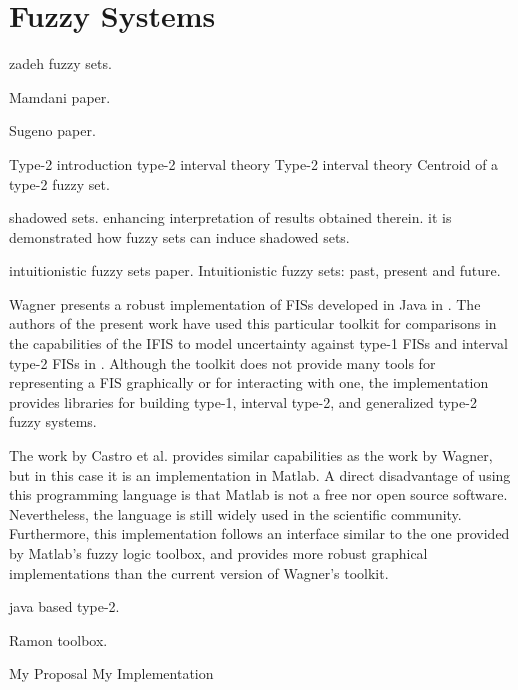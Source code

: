 \section{Fuzzy Systems}
\label{section:fuzzy-systems}

\cite{Zadeh1965} zadeh fuzzy sets.

\cite{Mamdani1975} Mamdani paper.

\cite{Takagi1985} Sugeno paper.


\cite{Mendel2002} Type-2 introduction
\cite{Mendel2006} type-2 interval theory
\cite{Liang2000} Type-2 interval theory
\cite{Karnik2001} Centroid of a type-2 fuzzy set.

\cite{Pedrycz1998} shadowed sets. enhancing interpretation of results
obtained therein. it is demonstrated how fuzzy
sets can induce shadowed sets.

\cite{Atanassov1986} intuitionistic fuzzy sets paper.
\cite{Atanassov2003} Intuitionistic fuzzy sets: past, present and future.


Wagner presents a robust implementation of FISs developed in Java in
\cite{Wagner2013}. The authors of the present work have used this particular
toolkit for comparisons in the capabilities of the IFIS to model uncertainty
against type-1 FISs and interval type-2 FISs in
\cite{Hernandez-Aguila2016}. Although the toolkit does not provide many tools
for representing a FIS graphically or for interacting with one, the
implementation provides libraries for building type-1, interval type-2, and
generalized type-2 fuzzy systems.

The work by Castro et al. \cite{castro2007interval} provides similar
capabilities as the work by Wagner, but in this case it is an implementation in
Matlab. A direct disadvantage of using this programming language is that Matlab
is not a free nor open source software.  Nevertheless, the language is still
widely used in the scientific community. Furthermore, this implementation
follows an interface similar to the one provided by Matlab's fuzzy logic
toolbox, and provides more robust graphical implementations than the current
version of Wagner's toolkit.

\cite{Wagner2013} java based type-2.

\cite{castro2007interval} Ramon toolbox.

\cite{Hernandez-aguila2016} My Proposal
\cite{Hernandez-Aguila2017} My Implementation

